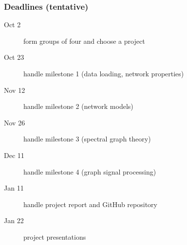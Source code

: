 \documentclass[aspectratio=169]{beamer}
\begin{document}

\begin{frame}
	\frametitle{Deadlines (tentative)}
	\begin{description}
		\item[Oct 2] form groups of four and choose a project
		\vfill
		\item[Oct 23] handle milestone 1 (data loading, network properties)
		\vfill
		\item[Nov 12] handle milestone 2 (network models)
		\vfill
		\item[Nov 26] handle milestone 3 (spectral graph theory)
		\vfill
		\item[Dec 11] handle milestone 4 (graph signal processing)
		\vfill
		\item[Jan 11] handle project report and GitHub repository
		\vfill
		\item[Jan 22] project presentations
	\end{description}
\end{frame}


\end{document}
